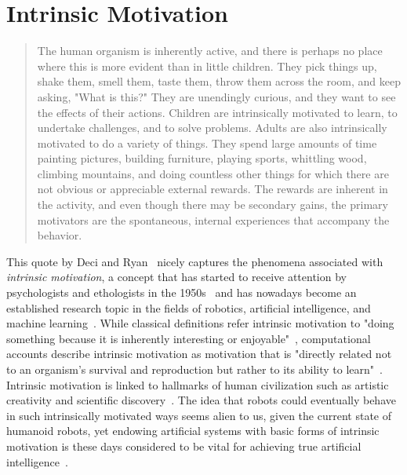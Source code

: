 \documentclass[a4paper]{scrreprt}
\begin{document}
\section{Intrinsic Motivation}
\label{sec:im}

\begin{quote}
The human organism is inherently active, and there is perhaps no
place where this is more evident than in little children. They pick
things up, shake them, smell them, taste them, throw them across
the room, and keep asking, "What is this?" They are unendingly
curious, and they want to see the effects of their actions. Children
are intrinsically motivated to learn, to undertake challenges, and to
solve problems.
Adults are also intrinsically motivated to do a variety of things. They spend large amounts of time painting pictures, building furniture, playing sports, whittling wood, climbing mountains, and doing countless other things for which there are not obvious or appreciable external rewards. The rewards are inherent in the activity, and even though there may be secondary gains, the primary motivators are the spontaneous, internal experiences that accompany the behavior.
\end{quote}

This quote by Deci and Ryan~\cite{deci85} nicely captures the phenomena associated with \textit{intrinsic motivation}, a concept that has started to receive attention by psychologists and ethologists in the 1950s~\cite{harlow50,harlow50b,berlyne54,white59} and has nowadays become an established research topic in the fields of robotics, artificial intelligence, and machine learning~\cite{baldassarre13}. While classical definitions refer intrinsic motivation to "doing something because it is inherently interesting or enjoyable"~\cite{ryan00b}, computational accounts describe intrinsic motivation as motivation that is "directly related not to an organism's survival and reproduction but rather to its ability to learn"~\cite{mirolli13}.
Intrinsic motivation is linked to hallmarks of human civilization such as artistic creativity and scientific discovery~\cite{ryan00,schmidhuber10}. The idea that robots could eventually behave in such intrinsically motivated ways seems alien to us, given the current state of humanoid robots, yet endowing artificial systems with basic forms of intrinsic motivation is these days considered to be vital for achieving true artificial intelligence~\cite{weng01}.
\end{document}
